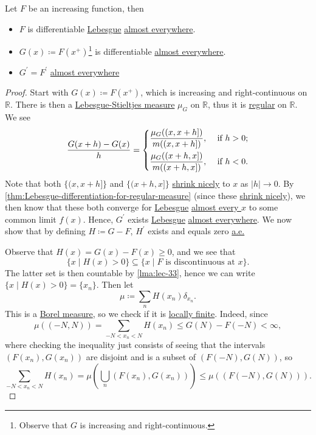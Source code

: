 \begin{theorem}\label{thm:monotone-differentiation}
	Let \(F\) be an increasing function, then
	\begin{itemize}
		\item \(F\) is differentiable \hyperref[def:Lebesgue-measure]{Lebesgue} \hyperref[def:mu-almost-everywhere]{almost everywhere}.
		\item \(G(x) \coloneqq F(x^+)\)\footnote{Observe that \(G\) is increasing and right-continuous.} is differentiable \hyperref[def:mu-almost-everywhere]{almost everywhere}.
		\item \(G^\prime  = F^\prime \) \hyperref[def:mu-almost-everywhere]{almost everywhere}
	\end{itemize}
\end{theorem}
\begin{proof}
	Start with \(G(x)\coloneqq F(x^+)\), which is increasing and right-continuous on \(\mathbb{R}\). There is then a
	\hyperref[def:Lebesgue-Stieltjes-measure]{Lebesgue-Stieltjes measure}
	\(\mu_G\) on \(\mathbb{R}\), thus it is \hyperref[def:regular]{regular} on \(\mathbb{R}\). We see
	\[
		\frac{G(x+h) - G(x)}{h} = \begin{dcases}
			\frac{\mu _{G} ((x, x+h])}{m((x, x+h])}, & \text{ if } h>0 ; \\
			\frac{\mu _{G} ((x+h, x])}{m((x+h, x])}, & \text{ if } h<0 .
		\end{dcases}
	\]
	Note that both \(\{(x, x+h]\}\) and \(\{(x+h, x]\}\) \hyperref[def:shrink-nicely]{shrink nicely} to \(x\) as \(\left\vert h \right\vert \to 0\). By \autoref{thm:Lebesgue-differentiation-for-regular-measure} (since these \hyperref[def:shrink-nicely]{shrink nicely}), we then know that these both converge for \hyperref[def:Lebesgue-measure]{Lebesgue} \hyperref[def:mu-almost-everywhere]{almost every \(x\)} to some common limit \(f(x)\). Hence, \(G^\prime\) exists \hyperref[def:Lebesgue-measure]{Lebesgue} \hyperref[def:mu-almost-everywhere]{almost everywhere}. We now show that by defining \(H \coloneqq G - F\), \(H^\prime \) exists and equals zero \hyperref[def:mu-almost-everywhere]{a.e.}

	Observe that \(H(x) = G(x) - F(x) \geq 0\), and we see that
	\[
		\{x \mid H(x) > 0\} \subseteq \{x \mid F \text{ is discontinuous at } x\}.
	\]
	The latter set is then countable by \autoref{lma:lec-33}, hence we can write \(\{x \mid H(x) > 0\} = \{x_n\}\). Then let
	\[
		\mu \coloneqq \sum_n H(x_n) \delta_{x_n}.
	\]
	This is a \hyperref[def:Borel-measure]{Borel measure}, so we check if it is \hyperref[def:locally-finite]{locally finite}. Indeed, since
	\[
		\mu((-N,N)) = \sum_{-N < x_n < N} H(x_n) \leq G(N) - F(-N) < \infty,
	\]
	where checking the inequality just consists of seeing that the intervals \((F(x_n), G(x_n))\) are disjoint and is a subset of \((F(-N),G(N))\), so
	\[
		\sum_{-N < x_n < N} H(x_n) = \mu\left( \bigcup_n (F(x_n), G(x_n)) \right) \leq \mu((F(-N),G(N))).
	\]


\end{proof}
